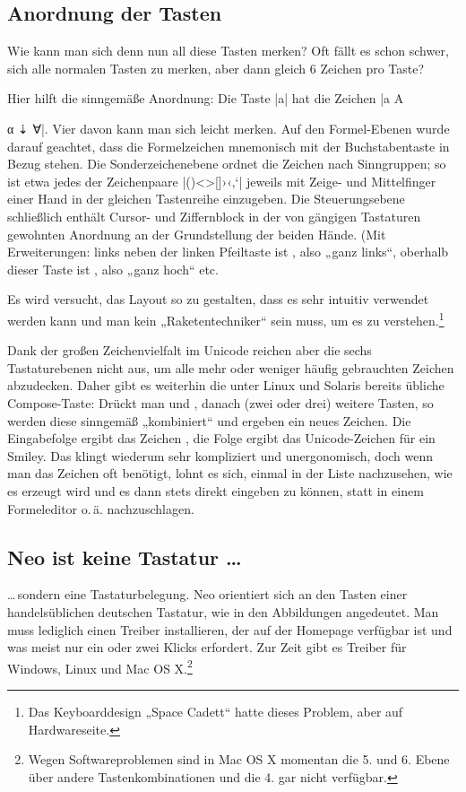 \documentclass[ngerman]{dtk}
\newcommand{\taste}[1]{\makebox{\textsf{#1}}}
\begin{document}
{\subsection{Anordnung der Tasten}
Wie kann man sich denn nun all diese Tasten merken? Oft fällt es schon schwer, sich alle normalen Tasten zu merken, aber dann gleich 6 Zeichen pro Taste?

Hier hilft die sinngemäße Anordnung: Die Taste |a| hat die Zeichen |a A { α ⇣ ∀|. Vier davon kann man sich leicht merken. Auf den Formel-Ebenen wurde darauf geachtet, dass die Formelzeichen mnemonisch mit der Buchstabentaste in Bezug stehen.  Die Sonderzeichenebene ordnet die Zeichen nach Sinngruppen; so ist etwa jedes der Zeichenpaare |()<>{}[]›‹‚‘| jeweils mit Zeige- und Mittelfinger einer Hand in der gleichen Tastenreihe einzugeben.  Die Steuerungsebene schließlich enthält Cursor- und Ziffernblock in der von gängigen Tastaturen gewohnten Anordnung an der Grundstellung der beiden Hände. (Mit Erweiterungen: links neben der linken Pfeiltaste ist \taste{Pos 1}, also „ganz links“, oberhalb dieser Taste ist \taste{Bild hoch}, also „ganz hoch“ etc.

Es wird versucht, das Layout so zu gestalten, dass es sehr intuitiv verwendet werden kann und man kein „Raketentechniker“ sein muss, um es zu verstehen.\footnote{Das Keyboarddesign „Space Cadett“ hatte dieses Problem, aber auf Hardwareseite.}

Dank der großen Zeichenvielfalt im Unicode reichen aber die sechs Tastaturebenen nicht aus, um alle mehr oder weniger häufig gebrauchten Zeichen abzudecken. Daher gibt es weiterhin die unter Linux und Solaris bereits übliche Compose-Taste: Drückt man \taste{Mod 3} und \taste{Tab}, danach (zwei oder drei) weitere Tasten, so werden diese sinngemäß „kombiniert“ und ergeben ein neues Zeichen. Die Eingabefolge \taste{Compose a e} ergibt das Zeichen \taste{æ}, die Folge \taste{Compose :)} ergibt das Unicode-Zeichen für ein Smiley. Das klingt wiederum sehr kompliziert und unergonomisch, doch wenn man das Zeichen oft benötigt, lohnt es sich, einmal in der Liste nachzusehen, wie es erzeugt wird und es dann stets direkt eingeben zu können, statt in einem Formeleditor o.\,ä. nachzuschlagen.

\subsection{Neo ist keine Tastatur \dots{}}
\dots{}\,sondern eine Tastaturbelegung. Neo orientiert sich an den Tasten einer handelsüblichen deutschen Tastatur, wie in den Abbildungen angedeutet. Man muss lediglich einen Treiber installieren, der auf der Homepage verfügbar ist und was meist nur ein oder zwei Klicks erfordert. Zur Zeit gibt es Treiber für Windows, Linux und Mac OS X.\footnote{Wegen Softwareproblemen sind in Mac OS X momentan die 5. und 6. Ebene über andere Tastenkombinationen und die 4. gar nicht verfügbar.}

}}
\end{document}

